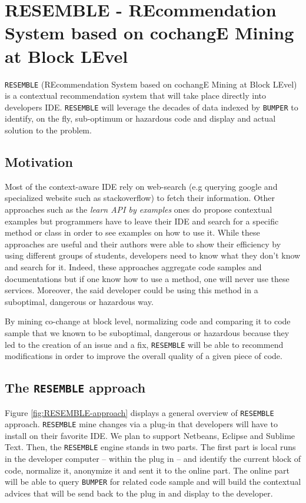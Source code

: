 
\section{RESEMBLE - REcommendation System based on cochangE Mining at Block LEvel\label{sec:RESEMBLE}}

{\tt RESEMBLE} (REcommendation System based on cochangE Mining at Block LEvel) is a contextual recommendation system that will take place directly into developers IDE. {\tt RESEMBLE} will leverage the decades of data indexed by {\tt BUMPER} to identify, on the fly, sub-optimum or hazardous code and display and actual solution to the problem.

\subsection{Motivation}

Most of the context-aware IDE \cite{Brandt2009,JoelBrandt} rely on web-search (e.g querying google and specialized website such as stackoverflow) to fetch their information.
Other approaches such as the {\it learn API by examples} ones \cite{Kim2011,Montandon2013} do propose contextual examples but programmers have to leave their IDE and search for a specific method or class in order to see examples on how to use it.
While these approaches are useful and their authors were able to show their efficiency by using different groups of students, developers need to know what they don't know and search for it.
Indeed, these approaches aggregate code samples and documentations but if one know how to use a method, one will never use these services.
Moreover, the said developer could be using this method in a suboptimal, dangerous or hazardous way.

By mining co-change at block level, normalizing code and comparing it to code sample that we known to be suboptimal, dangerous or hazardous because they led to the creation of an issue and a fix, {\tt RESEMBLE} will be able to recommend modifications in order to improve the overall quality of a given piece of code.

\subsection{The {\tt RESEMBLE} approach}

Figure \ref{fig:RESEMBLE-approach} displays a general overview of {\tt RESEMBLE} approach. {\tt RESEMBLE} mine changes via a plug-in that developers will have to install on their favorite IDE. We plan to support Netbeans, Eclipse and Sublime Text.
Then, the {\tt RESEMBLE} engine stands in two parts. The first part is local runs in the developer computer -- within the plug in -- and identify the current block of code, normalize it, anonymize it and sent it to the online part.
The online part will be able to query {\tt BUMPER} for related code sample and will build the contextual advices that will be send back to the plug in and display to the developer.

